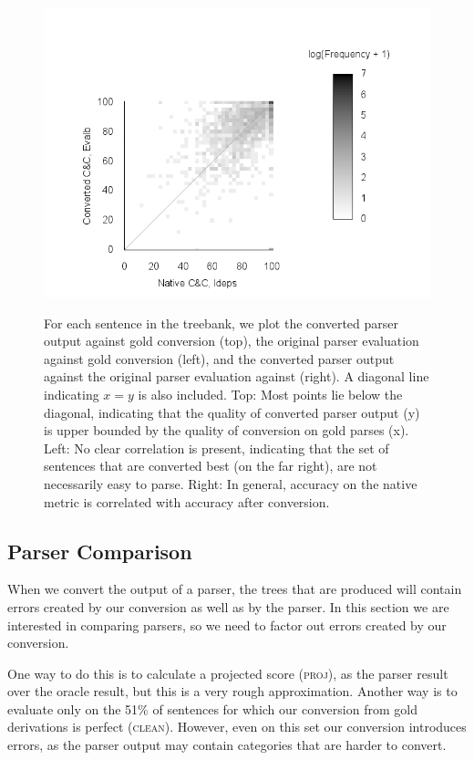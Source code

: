 \begin{figure}
{    \hfill
    \includegraphics[trim={15mm 0 65mm 40mm},clip]{figures/heat-both}
  }
	\caption{
		\label{fig:scatter_plots}
		For each sentence in the treebank, we plot the converted parser output against gold conversion (top), the original parser evaluation against gold conversion (left), and the converted parser output against the original parser evaluation against (right).
		A diagonal line indicating $x=y$ is also included.
		Top: Most points lie below the diagonal, indicating that the quality of converted parser output (y) is upper bounded by the quality of conversion on gold parses (x).
		Left: No clear correlation is present, indicating that the set of sentences that are converted best (on the far right), are not necessarily easy to parse.
		Right: In general, accuracy on the native metric is correlated with accuracy after conversion.
	}
\end{figure}

\subsection{Parser Comparison}

When we convert the output of a \ccg parser, the \ptb trees that are produced
will contain errors created by our conversion as well as by the parser. In this
section we are interested in comparing parsers, so we need to factor out errors
created by our conversion.

One way to do this is to calculate a projected score (\textsc{proj}), as the
parser result over the oracle result, but this is a very rough approximation.
Another way is to evaluate only on the 51\% of sentences for which our
conversion from gold \ccg derivations is perfect (\textsc{clean}).  However,
even on this set our conversion introduces errors, as the parser output may
contain categories that are harder to convert.


